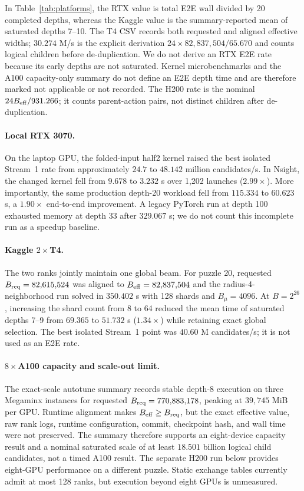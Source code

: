 \documentclass[10pt,twocolumn]{article}
\begin{document}
In Table~\ref{tab:platforms}, the RTX value is total E2E wall divided by 20
completed depths, whereas the Kaggle value is the summary-reported mean of
saturated depths 7--10.  The T4 CSV records both requested and aligned effective
widths; $30.274$ M/s is the explicit derivation
$24\times82{,}837{,}504/65.670$ and counts logical children before
de-duplication.  We do not derive an RTX E2E rate because its early depths are
not saturated.  Kernel microbenchmarks and the A100 capacity-only summary do
not define an E2E depth time and are therefore marked not applicable or not
recorded. The H200 rate is the nominal $24B_{\rm eff}/931.266$; it counts
parent-action pairs, not distinct children after de-duplication.

\paragraph{Local RTX 3070.}
On the laptop GPU, the folded-input half2 kernel raised the best isolated
Stream~1 rate from approximately $24.7$ to $48.142$ million candidates/s.  In
Nsight, the changed kernel fell from $9.678$ to $3.232$ s over 1,202 launches
($2.99\times$).  More importantly, the same production depth-20 workload fell
from $115.334$ to $60.623$ s, a $1.90\times$ end-to-end improvement.  A legacy
PyTorch run at depth 100 exhausted memory at depth 33 after $329.067$ s; we do
not count this incomplete run as a speedup baseline.

\paragraph{Kaggle $2\times$T4.}
The two ranks jointly maintain one global beam.  For puzzle 20, requested
$B_{\rm req}=82{,}615{,}524$ was aligned to
$B_{\rm eff}=82{,}837{,}504$ and the radius-4-neighborhood run solved in
$350.402$ s with 128 shards and $B_\mu=4096$.  At $B=2^{26}$, increasing the shard count from 8 to 64 reduced
the mean time of saturated depths 7--9 from $69.365$ to $51.732$ s
($1.34\times$) while retaining exact global selection.  The best isolated
Stream~1 point was $40.60$ M candidates/s; it is not used as an E2E rate.

\paragraph{$8\times$A100 capacity and scale-out limit.}
The exact-scale autotune summary records stable depth-8 execution on
three Megaminx instances for requested
$B_{\rm req}=770{,}883{,}178$, peaking at $39{,}745$ MiB per GPU.  Runtime
alignment makes $B_{\rm eff}\geq B_{\rm req}$, but the exact effective value,
raw rank logs, runtime configuration, commit, checkpoint hash, and wall time
were not preserved.  The summary therefore supports an eight-device capacity
result and a nominal saturated scale of at least $18.501$ billion logical child
candidates, not a timed A100 result. The separate H200 run below provides
eight-GPU performance on a different puzzle. Static exchange tables currently
admit at most 128 ranks, but execution beyond eight GPUs is unmeasured.
\end{document}
